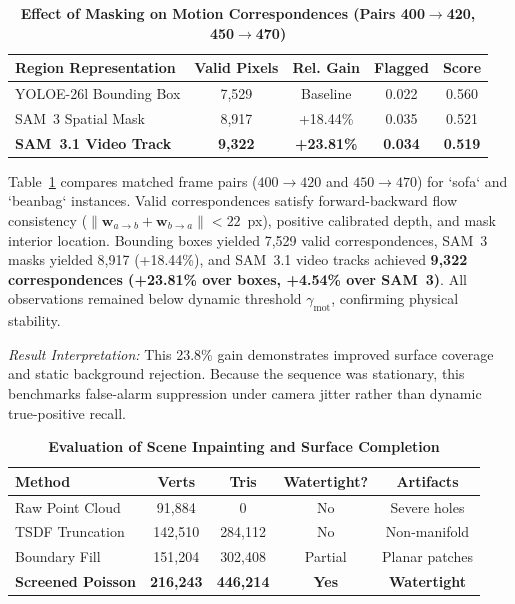 \documentclass[conference]{IEEEtran}
\begin{document}
\begin{table}[t]
\caption{\textbf{Effect of Masking on Motion Correspondences (Pairs 400$\to$420, 450$\to$470)}}
\label{tab:sam_motion_ablation}
\centering
\footnotesize
\setlength{\tabcolsep}{2.8pt}
\begin{tabularx}{\columnwidth}{@{}lcccc@{}}
\toprule
\textbf{Region Representation} & \textbf{Valid Pixels} & \textbf{Rel. Gain} & \textbf{Flagged} & \textbf{Score} \\
\midrule
YOLOE-26l Bounding Box & 7,529 & Baseline & 0.022 & 0.560 \\
SAM~3 Spatial Mask & 8,917 & +18.44\% & 0.035 & 0.521 \\
\textbf{SAM~3.1 Video Track} & \textbf{9,322} & \textbf{+23.81\%} & \textbf{0.034} & \textbf{0.519} \\
\bottomrule
\end{tabularx}
\end{table}

Table~\ref{tab:sam_motion_ablation} compares matched frame pairs ($400 \to 420$ and $450 \to 470$) for `sofa` and `beanbag` instances. Valid correspondences satisfy forward-backward flow consistency ($\|\mathbf{w}_{a \to b} + \mathbf{w}_{b \to a}\| < 22$~px), positive calibrated depth, and mask interior location. Bounding boxes yielded 7,529 valid correspondences, SAM~3 masks yielded 8,917 (+18.44\%), and SAM~3.1 video tracks achieved \textbf{9,322 correspondences (+23.81\% over boxes, +4.54\% over SAM~3)}. All observations remained below dynamic threshold $\gamma_{\mathrm{mot}}$, confirming physical stability.

\textit{Result Interpretation:} This 23.8\% gain demonstrates improved surface coverage and static background rejection. Because the sequence was stationary, this benchmarks false-alarm suppression under camera jitter rather than dynamic true-positive recall.

\begin{table}[t]
\caption{\textbf{Evaluation of Scene Inpainting and Surface Completion}}
\label{tab:inpainting_eval}
\centering
\footnotesize
\setlength{\tabcolsep}{2.5pt}
\begin{tabularx}{\columnwidth}{@{}lcccc@{}}
\toprule
\textbf{Method} & \textbf{Verts} & \textbf{Tris} & \textbf{Watertight?} & \textbf{Artifacts} \\
\midrule
Raw Point Cloud & 91,884 & 0 & No & Severe holes \\
TSDF Truncation & 142,510 & 284,112 & No & Non-manifold \\
Boundary Fill & 151,204 & 302,408 & Partial & Planar patches \\
\textbf{Screened Poisson} & \textbf{216,243} & \textbf{446,214} & \textbf{Yes} & \textbf{Watertight} \\
\bottomrule
\end{tabularx}
\end{table}
\end{document}
